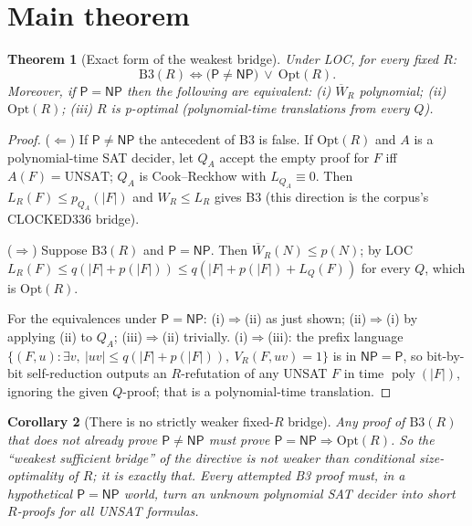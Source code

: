 \documentclass[11pt]{article}
\newtheorem{theorem}{Theorem}
\newtheorem{corollary}[theorem]{Corollary}
\theoremstyle{definition}\newtheorem{definition}[theorem]{Definition}
\newcommand{\poly}{\operatorname{poly}}
\begin{document}
\section{Main theorem}
\begin{theorem}[Exact form of the weakest bridge]\label{thm:exact}
Under LOC, for every fixed $R$:
\[
\boxed{\ \mathrm{B3}(R)\iff \bigl(\mathsf P\neq\mathsf{NP}\bigr)\ \lor\ \mathrm{Opt}(R).\ }
\]
Moreover, if $\mathsf P=\mathsf{NP}$ then the following are equivalent:
(i) $\overline W_R$ polynomial; (ii) $\mathrm{Opt}(R)$; (iii) $R$ is p-optimal
(polynomial-time translations from every $Q$).
\end{theorem}
\begin{proof}
($\Leftarrow$) If $\mathsf P\ne\mathsf{NP}$ the antecedent of B3 is false. If $\mathrm{Opt}(R)$
and $A$ is a polynomial-time SAT decider, let $Q_A$ accept the empty proof for $F$ iff $A(F)=\mathrm{UNSAT}$;
$Q_A$ is Cook--Reckhow with $L_{Q_A}\equiv 0$. Then $L_R(F)\le p_{Q_A}(|F|)$ and
$W_R\le L_R$ gives B3 (this direction is the corpus's CLOCKED336 bridge).

($\Rightarrow$) Suppose B3$(R)$ and $\mathsf P=\mathsf{NP}$. Then $\overline W_R(N)\le p(N)$; by LOC
$L_R(F)\le q(|F|+p(|F|))\le q(|F|+p(|F|)+L_Q(F))$ for every $Q$, which is Opt$(R)$.

For the equivalences under $\mathsf P=\mathsf{NP}$: (i)$\Rightarrow$(ii) as just shown;
(ii)$\Rightarrow$(i) by applying (ii) to $Q_A$; (iii)$\Rightarrow$(ii) trivially.
(i)$\Rightarrow$(iii): the prefix language
$\{(F,u):\exists v,\ |uv|\le q(|F|+p(|F|)),\ V_R(F,uv)=1\}$ is in $\mathsf{NP}=\mathsf P$, so
bit-by-bit self-reduction outputs an $R$-refutation of any UNSAT $F$ in time $\poly(|F|)$,
ignoring the given $Q$-proof; that is a polynomial-time translation.
\end{proof}

\begin{corollary}[There is no strictly weaker fixed-$R$ bridge]\label{cor:noweak}
Any proof of $\mathrm{B3}(R)$ that does not already prove $\mathsf P\ne\mathsf{NP}$ must prove
$\mathsf P=\mathsf{NP}\Rightarrow\mathrm{Opt}(R)$. So the ``weakest sufficient bridge'' of the
directive is not weaker than conditional size-optimality of $R$; it is exactly that.
Every attempted B3 proof must, in a hypothetical $\mathsf P=\mathsf{NP}$ world, turn an
\emph{unknown} polynomial SAT decider into short $R$-proofs for \emph{all} UNSAT formulas.
\end{corollary}
\end{document}

